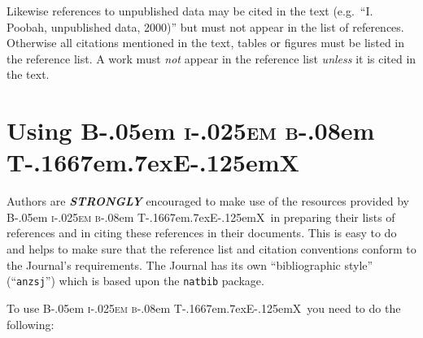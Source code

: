 \documentclass[
doublespace,
  times]{anzsauth}
\newcommand\BibTeX{{\rmfamily B\kern-.05em \textsc{i\kern-.025em b}\kern-.08em
T\kern-.1667em\lower.7ex\hbox{E}\kern-.125emX}}
\begin{document}
Likewise references to unpublished data may be cited in the text
(e.g.~``I. Poobah, unpublished data, 2000)'' but must not appear in the
list of references. Otherwise all citations mentioned in the text,
tables or figures must be listed in the reference list. A work must
\emph{not} appear in the reference list \emph{unless} it is cited in the
text.

\section{\texorpdfstring{Using \BibTeX~}{Using ~}}\label{sec-useBib}

Authors are \textbf{\emph{STRONGLY}} encouraged to make use of the
resources provided by \BibTeX~in preparing their lists of references and
in citing these references in their documents. This is easy to do and
helps to make sure that the reference list and citation conventions
conform to the Journal's requirements. The Journal has its own
``bibliographic style'' (``\texttt{anzsj}'') which is based upon the
\texttt{natbib} package.

To use \BibTeX~you need to do the following:
\end{document}
